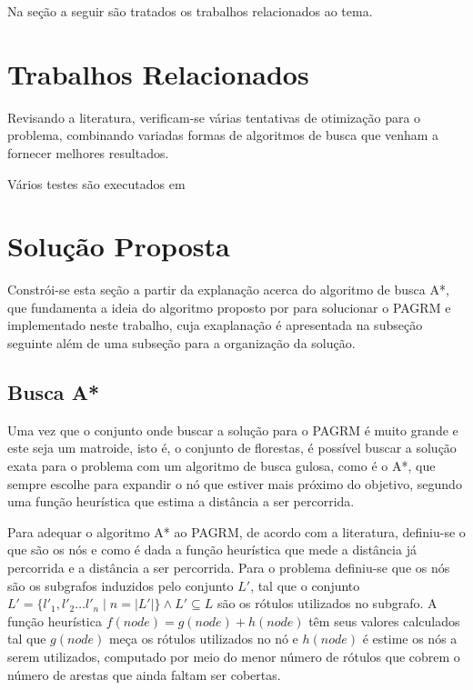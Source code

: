 \documentclass[12pt]{article}
\begin{document}
	Na seção a seguir são tratados os trabalhos relacionados ao tema.

\section{Trabalhos Relacionados}\label{sec:trabalhosRelacionados}

	Revisando a literatura, verificam-se várias tentativas de otimização para o problema, combinando variadas formas de algoritmos de busca que venham a fornecer melhores resultados.

	Vários testes são executados em \cite{consoli:2009}

\section{Solução Proposta}\label{sec:solucao}

	Constrói-se esta seção a partir da explanação acerca do algoritmo de busca A*, que fundamenta a ideia do algoritmo proposto por \cite{chang:1996} para solucionar o PAGRM e implementado neste trabalho, cuja exaplanação é apresentada na subseção seguinte além de uma subseção para a organização da solução.

	\subsection{Busca A*}\label{sec:aestrela}

		Uma vez que o conjunto onde buscar a solução para o PAGRM é muito grande e este seja um matroide, isto é, o conjunto de florestas, é possível buscar a solução exata para o problema com um algoritmo de busca gulosa, como é o A*, que sempre escolhe para expandir o nó que estiver mais próximo do objetivo, segundo uma função heurística que estima a distância a ser percorrida.

		Para adequar o algoritmo A* ao PAGRM, de acordo com a literatura, definiu-se o que são os nós e como é dada a função heurística que mede a distância já percorrida e a distância a ser percorrida. Para o problema definiu-se que os nós são os subgrafos induzidos pelo conjunto $L'$, tal que o conjunto $L' = \{l'_1, l'_2 \dots l'_n \mid n = |L'|\} \wedge L' \subseteq L$ são os rótulos utilizados no subgrafo. A função heurística $f(node) = g(node) + h(node)$ têm seus valores calculados tal que $g(node)$ meça os rótulos utilizados no nó e $h(node)$ é estime os nós a serem utilizados, computado por meio do menor número de rótulos que cobrem o número de arestas que ainda faltam ser cobertas.
\end{document}

